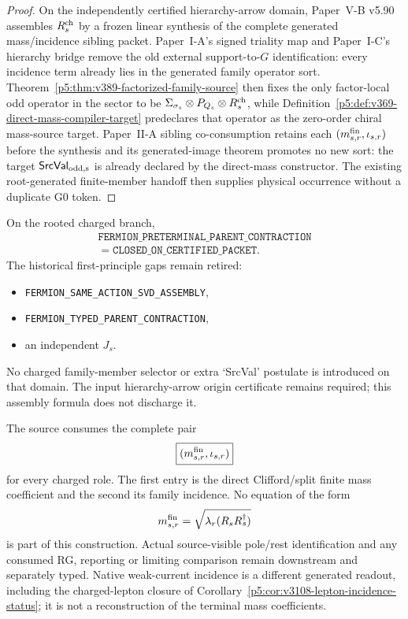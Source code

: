 \documentclass[12pt,a4paper]{article}
\begin{document}
\begin{proof}
On the independently certified hierarchy-arrow domain, Paper~V-B v5.90
assembles $R_s^{\rm ch}$ by a frozen linear synthesis of the complete
generated mass/incidence sibling packet.  Paper~I-A's signed triality
map and Paper~I-C's hierarchy bridge remove the old external support-to-$G$
identification: every incidence term already lies in the generated family
operator sort.  Theorem~\ref{p5:thm:v389-factorized-family-source} then fixes
the only factor-local odd operator in the sector to be
$\Sigma_{\sigma_s}\otimes P_{Q_s}\otimes R_s^{\rm ch}$, while
Definition~\ref{p5:def:v369-direct-mass-compiler-target} predeclares that
operator as the zero-order chiral mass-source target.  Paper~II-A sibling
co-consumption retains each $(m^{\rm fin}_{s,r},\iota_{s,r})$ before the
synthesis and its generated-image theorem promotes no new sort: the target
$\mathsf{SrcVal}_{\rm odd,s}$ is already declared by the direct-mass
constructor.  The existing root-generated finite-member handoff then supplies
physical occurrence without a duplicate G0 token.
\end{proof}

\begin{corollary}
\label{p5:cor:v397-charged-preterminal-assembly-closure}
On the rooted charged branch,
\[
 \boxed{\begin{gathered}
 \texttt{FERMION\_PRETERMINAL\_PARENT\_CONTRACTION}\\
 =\texttt{CLOSED\_ON\_CERTIFIED\_PACKET}.
 \end{gathered}}
\]
The historical first-principle gaps remain retired:
\begin{itemize}
\item \texttt{FERMION\_SAME\_ACTION\_SVD\_ASSEMBLY},
\item \texttt{FERMION\_TYPED\_PARENT\_CONTRACTION},
\item an independent $J_s$.
\end{itemize}  No charged family-member selector or extra `SrcVal' postulate is
introduced on that domain. The input hierarchy-arrow origin certificate
remains required; this assembly formula does not discharge it.
\end{corollary}

\begin{corollary}
\label{p5:cor:v397-mass-incidence-semantics}
The source consumes the complete pair
\[
 \boxed{(m^{\rm fin}_{s,r},\iota_{s,r})}
\]
for every charged role.  The first entry is the direct Clifford/split finite
mass coefficient and the second its family incidence.  No equation of the
form
\[
 m^{\rm fin}_{s,r}=\sqrt{\lambda_r(R_sR_s^\dagger)}
\]
is part of this construction.  Actual source-visible pole/rest identification and any consumed RG,
reporting or limiting comparison remain downstream and separately typed.
Native weak-current incidence is a different generated readout, including
the charged-lepton closure of Corollary~\ref{p5:cor:v3108-lepton-incidence-status};
it is not a reconstruction of the terminal mass coefficients.
\end{corollary}
\end{document}
